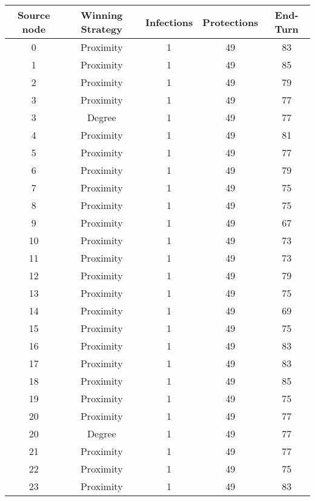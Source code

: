 \documentclass[results.tex]{subfiles}
\begin{document}
\begin{center}
  \begin{tabular}{| c || c | c | c | c |}
    \hline
    {\bfseries Source node} & {\bfseries Winning Strategy} & {\bfseries Infections} & {\bfseries Protections} & {\bfseries End-Turn} \\  %
    \hline\hline
    0 & Proximity & 1 & 49 & 83 \\ 
    \hline
    1 & Proximity & 1 & 49 & 85 \\ 
    \hline
    2 & Proximity & 1 & 49 & 79 \\ 
    \hline
    3 & Proximity & 1 & 49 & 77 \\ 
    \hline
    3 & Degree & 1 & 49 & 77 \\ 
    \hline
    4 & Proximity & 1 & 49 & 81 \\ 
    \hline
    5 & Proximity & 1 & 49 & 77 \\ 
    \hline
    6 & Proximity & 1 & 49 & 79 \\ 
    \hline
    7 & Proximity & 1 & 49 & 75 \\ 
    \hline
    8 & Proximity & 1 & 49 & 75 \\ 
    \hline
    9 & Proximity & 1 & 49 & 67 \\ 
    \hline
    10 & Proximity & 1 & 49 & 73 \\ 
    \hline
    11 & Proximity & 1 & 49 & 73 \\ 
    \hline
    12 & Proximity & 1 & 49 & 79 \\ 
    \hline
    13 & Proximity & 1 & 49 & 75 \\ 
    \hline
    14 & Proximity & 1 & 49 & 69 \\ 
    \hline
    15 & Proximity & 1 & 49 & 75 \\ 
    \hline
    16 & Proximity & 1 & 49 & 83 \\ 
    \hline
    17 & Proximity & 1 & 49 & 83 \\ 
    \hline
    18 & Proximity & 1 & 49 & 85 \\ 
    \hline
    19 & Proximity & 1 & 49 & 75 \\ 
    \hline
    20 & Proximity & 1 & 49 & 77 \\ 
    \hline
    20 & Degree & 1 & 49 & 77 \\ 
    \hline
    21 & Proximity & 1 & 49 & 77 \\ 
    \hline
    22 & Proximity & 1 & 49 & 75 \\ 
    \hline
    23 & Proximity & 1 & 49 & 83 \\ 

\end{tabular}
\end{center}
\end{document}
